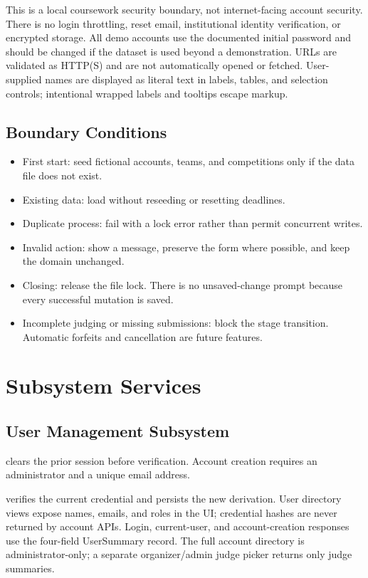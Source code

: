 \documentclass[12pt]{article}
\begin{document}
This is a local coursework security boundary, not internet-facing account security. There is no login throttling, reset email, institutional identity verification, or encrypted storage. All demo accounts use the documented initial password and should be changed if the dataset is used beyond a demonstration. URLs are validated as HTTP(S) and are not automatically opened or fetched. User-supplied names are displayed as literal text in labels, tables, and selection controls; intentional wrapped labels and tooltips escape markup.
\subsection{Boundary Conditions}
\begin{itemize}
\item First start: seed fictional accounts, teams, and competitions only if the data file does not exist.
\item Existing data: load without reseeding or resetting deadlines.
\item Duplicate process: fail with a lock error rather than permit concurrent writes.
\item Invalid action: show a message, preserve the form where possible, and keep the domain unchanged.
\item Closing: release the file lock. There is no unsaved-change prompt because every successful mutation is saved.
\item Incomplete judging or missing submissions: block the stage transition. Automatic forfeits and cancellation are future features.
\end{itemize}

\clearpage\section{Subsystem Services}
\subsection{User Management Subsystem}
 clears the prior session before verification. Account creation requires an administrator and a unique email address.

 verifies the current credential and persists the new derivation. User directory views expose names, emails, and roles in the UI; credential hashes are never returned by account APIs. Login, current-user, and account-creation responses use the four-field UserSummary record. The full account directory is administrator-only; a separate organizer/admin judge picker returns only judge summaries.
\end{document}
